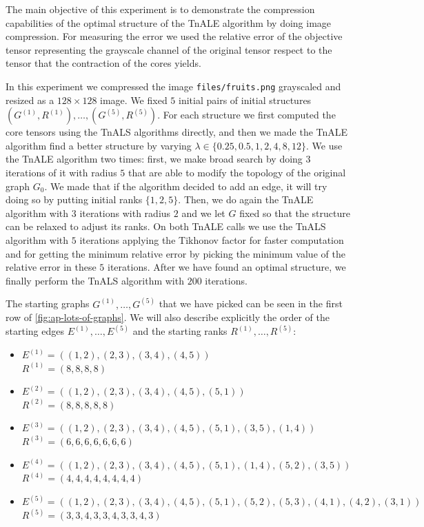 \documentclass[11pt,a4paper,openright,oneside]{book}
\numberwithin{equation}{section}
\newcommand{\figref}[1]{\cref{#1}}
\begin{document}
{The main objective of this experiment is to demonstrate the compression capabilities of the optimal structure of the \gls{TnALE} algorithm by
doing image compression. For measuring the error we used the relative error of the objective tensor representing the grayscale channel
of the original tensor respect to the tensor that the contraction of the cores yields.

In this experiment we compressed the image \verb|files/fruits.png| grayscaled and resized as a $128 \times 128$ image.
We fixed $5$ initial pairs of initial structures $(G^{(1)}, R^{(1)}), \dots, (G^{(5)}, R^{(5)})$.
For each structure we first computed the core tensors using the TnALS algorithms directly, and then
we made the \gls{TnALE} algorithm find a better structure by varying $\lambda \in \{0.25, 0.5, 1, 2, 4, 8, 12\}$. We use the
\gls{TnALE} algorithm two times: first, we make broad search by doing $3$ iterations of it with radius $5$ that are able to modify
the topology of the original graph $G_0$. We made that if the algorithm decided to add an edge, it will try doing so by putting initial
ranks $\{1, 2, 5\}$. Then, we do again the \gls{TnALE} algorithm with $3$ iterations with radius $2$ and we let $G$ fixed so that
the structure can be relaxed to adjust its ranks. On both \gls{TnALE} calls we use the
\gls{TnALS} algorithm with $5$ iterations applying the Tikhonov factor for faster computation and
for getting the minimum relative error by 
picking the minimum value of the relative error in these $5$ iterations.
After we have found an optimal structure, we finally perform the TnALS algorithm with $200$ iterations. 

The starting graphs $G^{(1)},\dots , G^{(5)}$ that we have picked can be seen in the first row of \figref{fig:ap-lots-of-graphs}.
We will also describe explicitly the order of the starting edges $E^{(1)}, \dots, E^{(5)}$ and the starting ranks $R^{(1)}, \dots, R^{(5)}$: 

\begin{itemize}
    \item $E^{(1)} = ((1,2), (2, 3), (3, 4), (4, 5))$ \\ 
        $R^{(1)} = (8,8,8,8)$
    \item $E^{(2)} = ((1,2), (2, 3), (3, 4), (4, 5), (5, 1))$ \\
        $R^{(2)} = (8,8,8,8,8)$
    \item $E^{(3)} = ((1,2), (2, 3), (3, 4), (4, 5), (5, 1), (3, 5), (1, 4))$ \\
        $R^{(3)} = (6,6,6,6,6,6,6)$
    \item $E^{(4)} = ((1,2), (2, 3), (3, 4), (4, 5), (5, 1), (1, 4), (5, 2), (3, 5))$ \\
        $R^{(4)} = (4,4,4,4, 4,4,4,4)$
    \item $E^{(5)} = ((1,2), (2, 3), (3, 4), (4, 5), (5, 1), (5, 2), (5, 3), (4, 1), (4, 2), (3, 1))$ \\
        $R^{(5)} = (3,3,4,3,3,4,3,3,4,3)$
\end{itemize}

}
\end{document}
